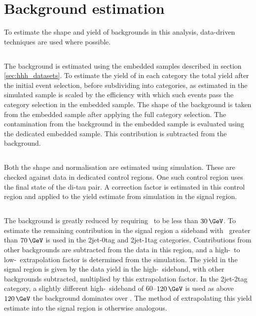 \section{Background estimation}
\label{sec:hhh_backgrounds}
To estimate the shape and yield of backgrounds in this analysis, data-driven techniques are
used where possible. 
\subsection{\texorpdfstring{\Ztautau}{Z to tau tau}}
\label{sec:hhh_backgrounds_ztt}
The \Ztautau background is estimated using the embedded samples
described in section \ref{sec:hhh_datasets}. To estimate the 
yield of \Ztautau in each category the total
yield after the initial event selection, before subdividing into categories, as
estimated in the simulated \Ztautau sample is scaled by the efficiency with which 
such events pass the category selection in the embedded sample. The shape of
the \Ztautau background is taken from the embedded sample after applying the full
category selection. The contamination from the \ttbar background in the embedded
sample is evaluated using the dedicated \ttbar embedded sample. This contribution
is subtracted from the \Ztautau background.
\subsection{\texorpdfstring{\ttbar}{ttbar}}
Both the \ttbar shape and normalisation are estimated using simulation.
These are checked against data in dedicated control regions. One such control
region uses the \emu final state of the di-tau pair. A correction factor is estimated in 
this control region and applied to the yield estimate from simulation in the signal region. 
\subsection{\texorpdfstring{\Wjets}{W + jets}}
\label{sec:hhh_backgrounds_wjets}
The \Wjets background is greatly reduced by requiring \mT~to
be less than $30\,\GeV$. To estimate the remaining contribution
in the signal region a sideband with \mT~greater
than $70\,\GeV$ is used in the 2jet-0tag and 2jet-1tag categories.
Contributions from other backgrounds are subtracted 
from the data in this region, and a high-\mT~to low-\mT~extrapolation
 factor is determined from the \Wjets simulation.
The yield in the signal region is given by the data yield in the high-\mT~sideband, with
other backgrounds subtracted, multiplied by this extrapolation factor.
In the 2jet-2tag category, a slightly different high-\mT~sideband of $60$--$120\,\GeV$ is used 
as above $120\,\GeV$ the \ttbar background dominates over \Wjets. 
The method of extrapolating this yield estimate into
the signal region is otherwise analogous.

